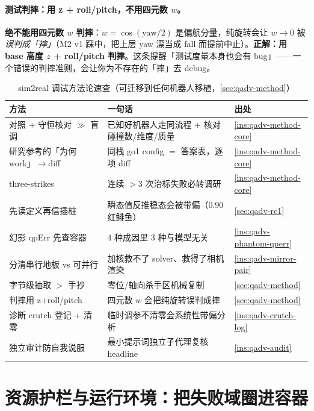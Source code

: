 \paragraph{测试判摔：用 z + roll/pitch，不用四元数 $w$。}
\textbf{绝不能用四元数 $w$ 判摔}：$w=\cos(\mathrm{yaw}/2)$ 是偏航分量，纯旋转会让 $w\to0$ 被\emph{误判成「摔」}（M2 v1 踩中，把上层 yaw 漂当成 fall 而提前中止）。\textbf{正解：用 base 高度 $z$ + roll/pitch 判摔}。这条提醒「测试度量本身也会有 bug」——一个错误的判摔准则，会让你为不存在的「摔」去 debug。

\begin{table}[H]\centering\small
\caption{sim2real 调试方法论速查（可迁移到任何机器人移植，\cref{sec:qadv-method}）}
\begin{tabular}{p{} p{} p{}}
\toprule
方法 & 一句话 & 出处 \\
\midrule
对照 + 守恒核对 $\gg$ 盲调 & 已知好机器人走同流程 + 核对碰撞数/维度/质量 & \cref{ins:qadv-method-core} \\
研究参考的「为何 work」$\to$diff & 同栈 go1 config $=$ 答案表，逐项 diff & \cref{ins:qadv-method-core} \\
three-strikes & 连续 $>3$ 次治标失败必转调研 & \cref{ins:qadv-method-core} \\
先读定义再信插桩 & 瞬态值反推稳态会被带偏（$0.90$ 红鲱鱼）& \cref{sec:qadv-rc1} \\
幻影 qpErr 先查容器 & $4$ 种成因里 $3$ 种与模型无关 & \cref{ins:qadv-phantom-qperr} \\
分清串行地板 vs 可并行 & 加核救不了 solver、救得了相机渲染 & \cref{ins:qadv-mirror-pair} \\
字节级抽取 $>$ 手抄 & 零位/轴向杀手区机械复制 & \cref{sec:qadv-method} \\
判摔用 z+roll/pitch & 四元数 $w$ 会把纯旋转误判成摔 & \cref{sec:qadv-method} \\
诊断 crutch 登记 + 清零 & 临时调参不清零会系统性带偏分析 & \cref{ins:qadv-crutch-log} \\
独立审计防自我说服 & 最小提示词独立子代理复核 headline & \cref{ins:qadv-audit} \\
\bottomrule
\end{tabular}
\label{tab:qadv-method}
\end{table}

\section{资源护栏与运行环境：把失败域圈进容器}
\label{sec:qadv-guardrail}

